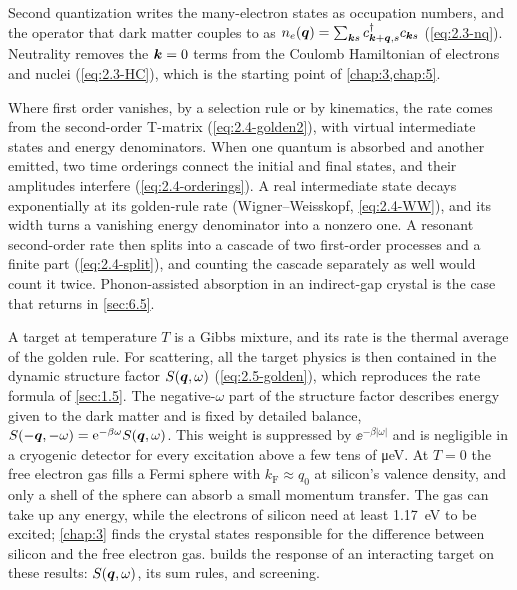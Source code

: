 Second quantization writes the many-electron states as occupation numbers, and the operator that dark matter couples to as $n_e(\bm{q}) = \sum_{\bm{k}s}c^\dagger_{\bm{k}+\bm{q},s}c_{\bm{k}s}$ (\cref{eq:2.3-nq}). Neutrality removes the $\bm{k} = 0$ terms from the Coulomb Hamiltonian of electrons and nuclei (\cref{eq:2.3-HC}), which is the starting point of \cref{chap:3,chap:5}.

Where first order vanishes, by a selection rule or by kinematics, the rate comes from the second-order T-matrix (\cref{eq:2.4-golden2}), with virtual intermediate states and energy denominators. When one quantum is absorbed and another emitted, two time orderings connect the initial and final states, and their amplitudes interfere (\cref{eq:2.4-orderings}). A real intermediate state decays exponentially at its golden-rule rate (Wigner--Weisskopf, \cref{eq:2.4-WW}), and its width turns a vanishing energy denominator into a nonzero one. A resonant second-order rate then splits into a cascade of two first-order processes and a finite part (\cref{eq:2.4-split}), and counting the cascade separately as well would count it twice. Phonon-assisted absorption in an indirect-gap crystal is the case that returns in \cref{sec:6.5}.

A target at temperature $T$ is a Gibbs mixture, and its rate is the thermal average of the golden rule. For scattering, all the target physics is then contained in the dynamic structure factor $S(\bm{q},\omega)$ (\cref{eq:2.5-golden}), which reproduces the rate formula of \cref{sec:1.5}. The negative-$\omega$ part of the structure factor describes energy given to the dark matter and is fixed by detailed balance, $S(-\bm{q},-\omega) = \mathrm{e}^{-\beta\omega}S(\bm{q},\omega)$. This weight is suppressed by $\ee^{-\beta|\omega|}$ and is negligible in a cryogenic detector for every excitation above a few tens of \si{\micro eV}. At $T = 0$ the free electron gas fills a Fermi sphere with $k_{\mathrm{F}} \approx q_0$ at silicon's valence density, and only a shell of the sphere can absorb a small momentum transfer. The gas can take up any energy, while the electrons of silicon need at least \SI{1.17}{eV} to be excited; \cref{chap:3} finds the crystal states responsible for the difference between silicon and the free electron gas.  builds the response of an interacting target on these results: $S(\bm{q},\omega)$, its sum rules, and screening.
